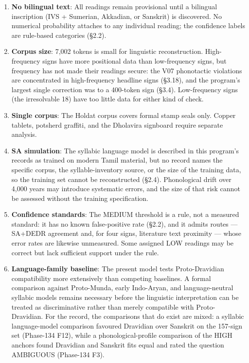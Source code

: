 \documentclass[
]{article}
\providecommand{\tightlist}{%
  \setlength{\itemsep}{0pt}\setlength{\parskip}{0pt}}
\begin{document}
\begin{enumerate}
\def\labelenumi{\arabic{enumi}.}
\tightlist
\item
  \textbf{No bilingual text}: All readings remain provisional until a bilingual inscription (IVS + Sumerian, Akkadian, or Sanskrit) is discovered. No numerical probability attaches to any individual reading; the confidence labels are rule-based categories (§2.2).
\item
  \textbf{Corpus size}: 7,002 tokens is small for linguistic reconstruction. High-frequency signs have more positional data than low-frequency signs, but frequency has not made their readings secure: the V07 phonotactic violations are concentrated in high-frequency headline signs (§3.18), and the program's largest single correction was to a 400-token sign (§3.4). Low-frequency signs (the irresolvable 18) have too little data for either kind of check.
\item
  \textbf{Single corpus}: The Holdat corpus covers formal stamp seals
  only. Copper tablets, potsherd graffiti, and the Dholavira signboard
  require separate analysis.
\item
  \textbf{SA simulation}: The syllabic language model is described in this program's records as trained on modern Tamil material, but no record names the specific corpus, the syllable-inventory source, or the size of the training data, so the training set cannot be reconstructed (§2.4). Phonological drift over 4,000 years may introduce systematic errors, and the size of that risk cannot be assessed without the training specification.
\item
  \textbf{Confidence standards}: The MEDIUM threshold is a rule, not a measured standard: it has no known false-positive rate (§2.2), and it admits routes --- SA+DEDR agreement and, for four signs, literature text proximity --- whose error rates are likewise unmeasured. Some assigned LOW readings may be correct but lack sufficient support under the rule.
\item
  \textbf{Language-family baseline}: The present model tests Proto-Dravidian
  compatibility more extensively than competing baselines. A formal comparison
  against Proto-Munda, early Indo-Aryan, and language-neutral syllabic models
  remains necessary before the linguistic interpretation can be treated as discriminative rather than merely compatible with Proto-Dravidian. For the record, the comparisons that do exist are mixed: a syllabic language-model comparison favoured Dravidian over Sanskrit on the 157-sign set (Phase-134 F12), while a phonological-profile comparison of the HIGH anchors found Dravidian and Sanskrit fits equal and rated the question AMBIGUOUS (Phase-134 F3).
\end{enumerate}
\end{document}
